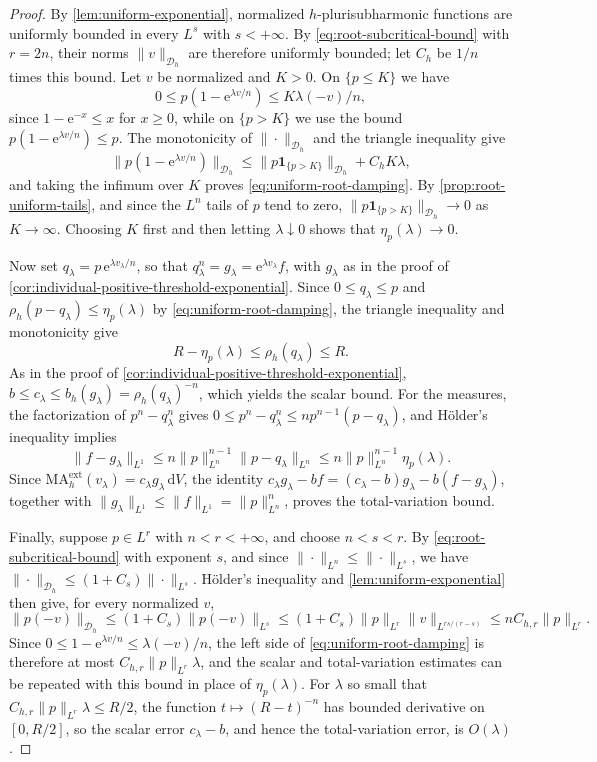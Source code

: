 \begin{proof}
By \cref{lem:uniform-exponential}, normalized $h$-plurisubharmonic functions are uniformly bounded in every $L^s$ with $s<+\infty$. By \eqref{eq:root-subcritical-bound} with $r=2n$, their norms $\|v\|_{\mathcal D_h}$ are therefore uniformly bounded; let $C_h$ be $1/n$ times this bound. Let $v$ be normalized and $K>0$. On $\{p\leq K\}$ we have
\[
 0\leq p(1-\mathrm{e}^{\lambda v/n})
     \leq K\lambda(-v)/n,
\]
since $1-\mathrm{e}^{-x}\leq x$ for $x\geq0$, while on $\{p>K\}$ we use the bound $p(1-\mathrm{e}^{\lambda v/n})\leq p$. The monotonicity of $\|\cdot\|_{\mathcal D_h}$ and the triangle inequality give
\[
 \big\|p(1-\mathrm{e}^{\lambda v/n})\big\|_{\mathcal D_h}
 \leq\|p\mathbf1_{\{p>K\}}\|_{\mathcal D_h}+C_hK\lambda,
\]
and taking the infimum over $K$ proves \eqref{eq:uniform-root-damping}. By \cref{prop:root-uniform-tails}, and since the $L^n$ tails of $p$ tend to zero, $\|p\mathbf1_{\{p>K\}}\|_{\mathcal D_h}\to0$ as $K\to\infty$. Choosing $K$ first and then letting $\lambda\downarrow0$ shows that $\eta_p(\lambda)\to0$.

Now set $q_\lambda=p\,\mathrm{e}^{\lambda v_\lambda/n}$, so that $q_\lambda^n=g_\lambda=\mathrm{e}^{\lambda v_\lambda}f$, with $g_\lambda$ as in the proof of \cref{cor:individual-positive-threshold-exponential}. Since $0\leq q_\lambda\leq p$ and $\rho_h(p-q_\lambda)\leq\eta_p(\lambda)$ by \eqref{eq:uniform-root-damping}, the triangle inequality and monotonicity give
\[
 R-\eta_p(\lambda)\leq\rho_h(q_\lambda)\leq R.
\]
As in the proof of \cref{cor:individual-positive-threshold-exponential}, $b\leq c_\lambda\leq b_h(g_\lambda)=\rho_h(q_\lambda)^{-n}$, which yields the scalar bound. For the measures, the factorization of $p^n-q_\lambda^n$ gives $0\leq p^n-q_\lambda^n\leq np^{n-1}(p-q_\lambda)$, and H\"older's inequality implies
\[
 \|f-g_\lambda\|_{L^1}
 \leq n\|p\|_{L^n}^{n-1}\|p-q_\lambda\|_{L^n}
 \leq n\|p\|_{L^n}^{n-1}\eta_p(\lambda).
\]
Since $\mathrm{MA}^{\mathrm{ext}}_h(v_\lambda)=c_\lambda g_\lambda\,\mathrm{d}V$, the identity $c_\lambda g_\lambda-bf=(c_\lambda-b)g_\lambda-b(f-g_\lambda)$, together with $\|g_\lambda\|_{L^1}\leq\|f\|_{L^1}=\|p\|_{L^n}^n$, proves the total-variation bound.

Finally, suppose $p\in L^r$ with $n<r<+\infty$, and choose $n<s<r$. By \eqref{eq:root-subcritical-bound} with exponent $s$, and since $\|\cdot\|_{L^n}\leq\|\cdot\|_{L^s}$, we have $\|\cdot\|_{\mathcal D_h}\leq(1+C_s)\|\cdot\|_{L^s}$. H\"older's inequality and \cref{lem:uniform-exponential} then give, for every normalized $v$,
\[
 \|p(-v)\|_{\mathcal D_h}
 \leq(1+C_s)\|p(-v)\|_{L^s}
 \leq(1+C_s)\|p\|_{L^r}\|v\|_{L^{rs/(r-s)}}
 \leq nC_{h,r}\|p\|_{L^r}.
\]
Since $0\leq1-\mathrm{e}^{\lambda v/n}\leq\lambda(-v)/n$, the left side of \eqref{eq:uniform-root-damping} is therefore at most $C_{h,r}\|p\|_{L^r}\lambda$, and the scalar and total-variation estimates can be repeated with this bound in place of $\eta_p(\lambda)$. For $\lambda$ so small that $C_{h,r}\|p\|_{L^r}\lambda\leq R/2$, the function $t\mapsto(R-t)^{-n}$ has bounded derivative on $[0,R/2]$, so the scalar error $c_\lambda-b$, and hence the total-variation error, is $O(\lambda)$.
\end{proof}

